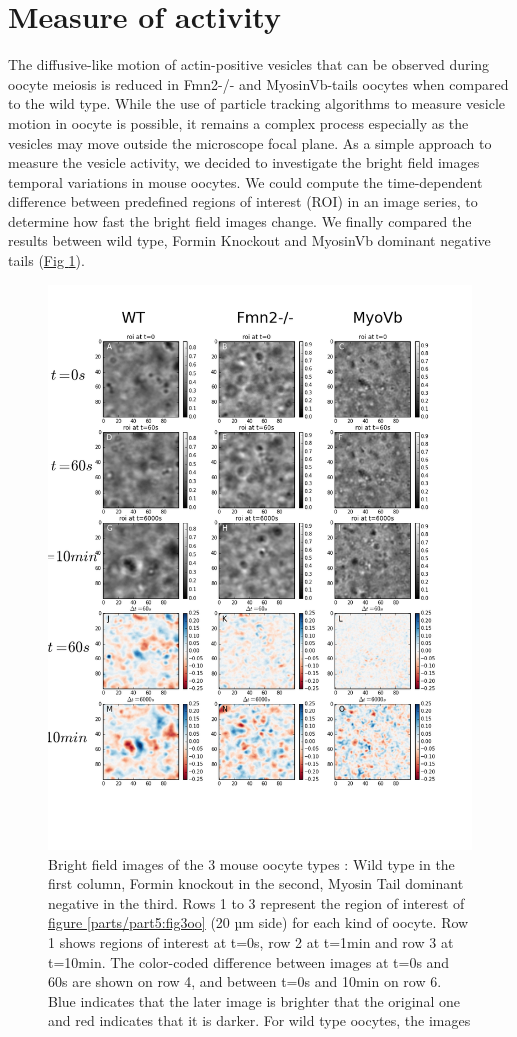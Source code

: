 \documentclass[A4paperpaper,11pt,english]{sphinxmanual}
\begin{document}
\section{Measure of activity}
\label{parts/part5:measure-of-activity}
The diffusive-like motion of actin-positive vesicles that can be observed during oocyte meiosis is
reduced in Fmn2-/- and MyosinVb-tails oocytes when compared to the wild type.
While the use of particle tracking algorithms to measure vesicle motion in oocyte is possible, it remains a
complex process especially as the vesicles may move outside the microscope focal
plane. As a simple approach to measure the vesicle activity, we decided to
investigate the bright field images temporal variations in mouse oocytes.
We could compute the time-dependent difference between predefined regions of interest (ROI) in an image
series, to determine how fast the bright field images change. We finally compared
the results between wild type, Formin Knockout and MyosinVb dominant negative tails (\hyperref[parts/part5:decay-all]{Fig  \ref*{parts/part5:decay-all}}).
\begin{figure}[htbp]
\centering
\capstart

\includegraphics[width=0.800\linewidth]{decay-all.png}
\caption{Bright field images of the 3 mouse oocyte types : Wild type in the first column,
Formin knockout in the second, Myosin Tail dominant negative in the third. Rows 1
to 3 represent the region of interest of \hyperref[parts/part5:fig3oo]{figure  \ref*{parts/part5:fig3oo}} (20 µm side)
for each kind of oocyte. Row 1 shows regions of interest at t=0s, row 2 at
t=1min and row 3 at t=10min. The color-coded difference between images at
t=0s and 60s are shown on row 4, and between t=0s and 10min on row 6. Blue
indicates that the later image is brighter that the original one and red
indicates that it is darker. For wild type oocytes, the images}\label{parts/part5:decay-all}\end{figure}
\end{document}
